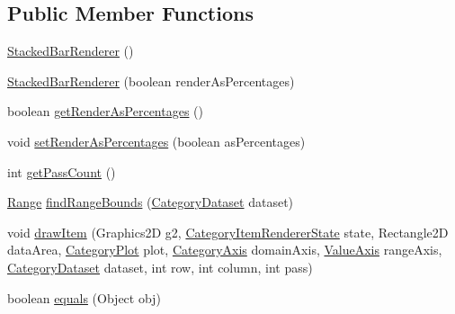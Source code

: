 \subsection*{Public Member Functions}
\begin{DoxyCompactItemize}
\item 
\mbox{\hyperlink{classorg_1_1jfree_1_1chart_1_1renderer_1_1category_1_1_stacked_bar_renderer_a4a26d87d89e56fadd50a2adf7f88d85d}{Stacked\+Bar\+Renderer}} ()
\item 
\mbox{\hyperlink{classorg_1_1jfree_1_1chart_1_1renderer_1_1category_1_1_stacked_bar_renderer_a1152e2d989d1ee37dfcfca431ae79427}{Stacked\+Bar\+Renderer}} (boolean render\+As\+Percentages)
\item 
boolean \mbox{\hyperlink{classorg_1_1jfree_1_1chart_1_1renderer_1_1category_1_1_stacked_bar_renderer_aa0f15aa6eb267d252b8895e826da57a2}{get\+Render\+As\+Percentages}} ()
\item 
void \mbox{\hyperlink{classorg_1_1jfree_1_1chart_1_1renderer_1_1category_1_1_stacked_bar_renderer_afd9a31b9a55544a2a59d90dd35e5ac4c}{set\+Render\+As\+Percentages}} (boolean as\+Percentages)
\item 
int \mbox{\hyperlink{classorg_1_1jfree_1_1chart_1_1renderer_1_1category_1_1_stacked_bar_renderer_a3c4c50f63e052eb83bf1ba4d3865a8a9}{get\+Pass\+Count}} ()
\item 
\mbox{\hyperlink{classorg_1_1jfree_1_1data_1_1_range}{Range}} \mbox{\hyperlink{classorg_1_1jfree_1_1chart_1_1renderer_1_1category_1_1_stacked_bar_renderer_a46a38af7e1841b7c0259f5ef4a7f1a24}{find\+Range\+Bounds}} (\mbox{\hyperlink{interfaceorg_1_1jfree_1_1data_1_1category_1_1_category_dataset}{Category\+Dataset}} dataset)
\item 
void \mbox{\hyperlink{classorg_1_1jfree_1_1chart_1_1renderer_1_1category_1_1_stacked_bar_renderer_abef7fd9506a9cf5a851b5ffad5c2e459}{draw\+Item}} (Graphics2D g2, \mbox{\hyperlink{classorg_1_1jfree_1_1chart_1_1renderer_1_1category_1_1_category_item_renderer_state}{Category\+Item\+Renderer\+State}} state, Rectangle2D data\+Area, \mbox{\hyperlink{classorg_1_1jfree_1_1chart_1_1plot_1_1_category_plot}{Category\+Plot}} plot, \mbox{\hyperlink{classorg_1_1jfree_1_1chart_1_1axis_1_1_category_axis}{Category\+Axis}} domain\+Axis, \mbox{\hyperlink{classorg_1_1jfree_1_1chart_1_1axis_1_1_value_axis}{Value\+Axis}} range\+Axis, \mbox{\hyperlink{interfaceorg_1_1jfree_1_1data_1_1category_1_1_category_dataset}{Category\+Dataset}} dataset, int row, int column, int pass)
\item 
boolean \mbox{\hyperlink{classorg_1_1jfree_1_1chart_1_1renderer_1_1category_1_1_stacked_bar_renderer_ae49ac59abfe81a9b61ec3c7067b15b3c}{equals}} (Object obj)
\end{DoxyCompactItemize}
